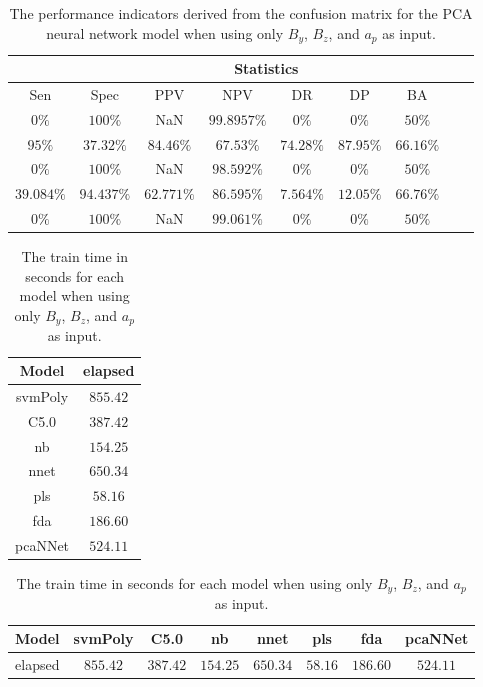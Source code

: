 \begin{table}[!ht]
	\centering
	\begin{tabular}{|c|c|c|c|c|c|c|c|c|}
		\hline
		 & \multicolumn{7}{c|}{Statistics} \\ \hline
		Sen & Spec & PPV & NPV & DR & DP & BA \\ \hline
		$0\%$ & $100\%$ & NaN & $99.8957\%$ & $0\%$ & $0\%$ & $50\%$ \\ \hline
		$95\%$ & $37.32\%$ & $84.46\%$ & $67.53\%$ & $74.28\%$ & $87.95\%$ & $66.16\%$ \\ \hline
		$0\%$ & $100\%$ & NaN & $98.592\%$ & $0\%$ & $0\%$ & $50\%$ \\ \hline
		$39.084\%$ & $94.437\%$ & $62.771\%$ & $86.595\%$ & $7.564\%$ & $12.05\%$ & $66.76\%$ \\ \hline
		$0\%$ & $100\%$ & NaN & $99.061\%$ & $0\%$ & $0\%$ & $50\%$ \\ \hline
	\end{tabular}
	\caption{The performance indicators derived from the confusion matrix for the PCA neural network model when using only $B_{y}$, $B_{z}$, and $a_{p}$ as input.}
	\label{tab:cs:yzap:pcaNNet}
\end{table}

\begin{table}[!ht]
	\centering
	\begin{tabular}{|c|c|}
		\hline
		Model & elapsed \\ \hline
		svmPoly & $855.42$ \\ \hline
		C5.0 & $387.42$ \\ \hline
		nb & $154.25$ \\ \hline
		nnet & $650.34$ \\ \hline
		pls & $58.16$ \\ \hline
		fda & $186.60$ \\ \hline
		pcaNNet & $524.11$ \\ \hline
	\end{tabular}
	\caption{The train time in seconds for each model when using only $B_{y}$, $B_{z}$, and $a_{p}$ as input.}
	\label{tab:time:yzap:train}
\end{table}

\begin{table}[!ht]
	\centering
	\begin{tabular}{|c|c|c|c|c|c|c|c|}
		\hline
		Model & svmPoly & C5.0 & nb & nnet & pls & fda & pcaNNet \\ \hline
		elapsed & $855.42$ & $387.42$ & $154.25$ & $650.34$ & $58.16$ & $186.60$ & $524.11$ \\ \hline
	\end{tabular}
	\caption{The train time in seconds for each model when using only $B_{y}$, $B_{z}$, and $a_{p}$ as input.}
	\label{tab:time:reverse:yzap:train}
\end{table}


